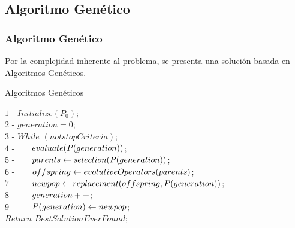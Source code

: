 \subsection{Algoritmo Genético}
\begin{frame}\frametitle{Algoritmo Genético}
\begin{small}
Por la complejidad inherente al problema, se presenta una solución basada en Algoritmos Genéticos.
\end{small}

    \begin{block}{Algoritmos Genéticos}
    \begin{small}
    
    $1$ - $Initialize(P_0)$;\\ 
    $2$ - $generation = 0$;\\	
    $3$ - $While$ $(not stopCriteria)$;\\		
	$4$ - 	$\hspace{6mm} evaluate (P(generation))$;\\
	$5$ - 	$\hspace{6mm} parents \gets selection (P(generation))$;\\
	$6$ - 	$\hspace{6mm} offspring \gets evolutiveOperators (parents)$;\\
	$7$ - 	$\hspace{6mm} newpop \gets replacement (offspring,P(generation))$;\\
	$8$ - 	$\hspace{6mm} generation ++ $;\\
	$9$ - 	$\hspace{6mm} P(generation) \gets newpop$;\\
	 		$Return$ $Best Solution Ever Found$;\\
	\end{small}
	
    \end{block}
\end{frame}


